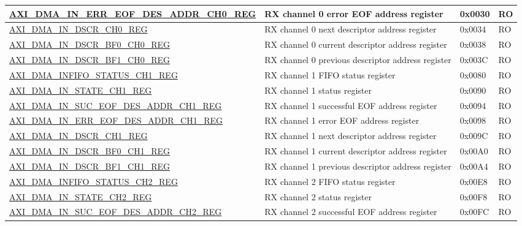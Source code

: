 \begin{longtable}{ | l | p{10cm} | p{1.3cm} | l | }
\hyperref[regdesc:AXIDMAINERREOFDESADDRCHNREG]{AXI\_DMA\_IN\_ERR\_EOF\_DES\_ADDR\_CH0\_REG} & RX channel 0 error EOF address register & 0x0030 & RO \\ \hline
\hyperref[regdesc:AXIDMAINDSCRCHNREG]{AXI\_DMA\_IN\_DSCR\_CH0\_REG} & RX channel 0 next descriptor address register & 0x0034 & RO \\ \hline
\hyperref[regdesc:AXIDMAINDSCRBF0CHNREG]{AXI\_DMA\_IN\_DSCR\_BF0\_CH0\_REG} & RX channel 0 current descriptor address register & 0x0038 & RO \\ \hline
\hyperref[regdesc:AXIDMAINDSCRBF1CHNREG]{AXI\_DMA\_IN\_DSCR\_BF1\_CH0\_REG} & RX channel 0 previous descriptor address register & 0x003C & RO \\ \hline
\hyperref[regdesc:AXIDMAINFIFOSTATUSCHNREG]{AXI\_DMA\_INFIFO\_STATUS\_CH1\_REG} & RX channel 1 FIFO status register & 0x0080 & RO \\ \hline
\hyperref[regdesc:AXIDMAINSTATECHNREG]{AXI\_DMA\_IN\_STATE\_CH1\_REG} & RX channel 1 status register & 0x0090 & RO \\ \hline
\hyperref[regdesc:AXIDMAINSUCEOFDESADDRCHNREG]{AXI\_DMA\_IN\_SUC\_EOF\_DES\_ADDR\_CH1\_REG} & RX channel 1 successful EOF address register & 0x0094 & RO \\ \hline
\hyperref[regdesc:AXIDMAINERREOFDESADDRCHNREG]{AXI\_DMA\_IN\_ERR\_EOF\_DES\_ADDR\_CH1\_REG} & RX channel 1 error EOF address register & 0x0098 & RO \\ \hline
\hyperref[regdesc:AXIDMAINDSCRCHNREG]{AXI\_DMA\_IN\_DSCR\_CH1\_REG} & RX channel 1 next descriptor address register & 0x009C & RO \\ \hline
\hyperref[regdesc:AXIDMAINDSCRBF0CHNREG]{AXI\_DMA\_IN\_DSCR\_BF0\_CH1\_REG} & RX channel 1 current descriptor address register & 0x00A0 & RO \\ \hline
\hyperref[regdesc:AXIDMAINDSCRBF1CHNREG]{AXI\_DMA\_IN\_DSCR\_BF1\_CH1\_REG} & RX channel 1 previous descriptor address register & 0x00A4 & RO \\ \hline
\hyperref[regdesc:AXIDMAINFIFOSTATUSCHNREG]{AXI\_DMA\_INFIFO\_STATUS\_CH2\_REG} & RX channel 2 FIFO status register & 0x00E8 & RO \\ \hline
\hyperref[regdesc:AXIDMAINSTATECHNREG]{AXI\_DMA\_IN\_STATE\_CH2\_REG} & RX channel 2 status register & 0x00F8 & RO \\ \hline
\hyperref[regdesc:AXIDMAINSUCEOFDESADDRCHNREG]{AXI\_DMA\_IN\_SUC\_EOF\_DES\_ADDR\_CH2\_REG} & RX channel 2 successful EOF address register & 0x00FC & RO \\ \hline

\end{longtable}
